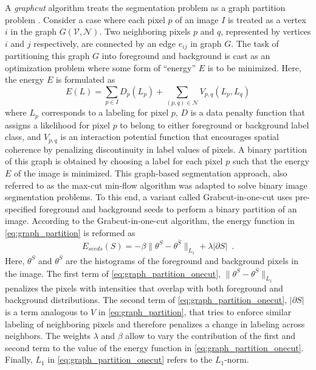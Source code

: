 A \textit{graphcut} algorithm treats the segmentation problem as a graph partition problem \cite{mincut_maxflow}. Consider a case where each pixel $p$ of an image $I$ is treated as a vertex $i$ in the graph $G(\mathcal{V},\mathcal{N})$. Two neighboring pixels $p$ and $q$, represented by vertices $i$ and $j$ respectively, are connected by an edge $e_{ij}$ in graph $G$. The task of partitioning this graph $G$ into foreground and background is cast as an optimization problem where some form of ``energy'' $E$ is to be minimized. Here, the energy $E$ is formulated as 
%
\begin{equation}	\label{eq:graph_partition}
  E(L)=\sum\limits_{p\in I} D_p(L_p)+\sum\limits_{(p,q)\in \mathcal{N}} V_{p,q} (L_p,L_q)
\end{equation}
%
where $L_p$ corresponds to a labeling for pixel $p$, $D$ is a data penalty function that assigns a likelihood for pixel $p$ to belong to either foreground or background label class, and $V_{p,q}$ is an interaction potential function that encourages spatial coherence by penalizing discontinuity in label values of pixels. A binary partition of this graph is obtained by choosing a label for each pixel $p$ such that the energy $E$ of the image is minimized. This graph-based segmentation approach, also referred to as the max-cut min-flow algorithm was adapted to solve binary image segmentation problems. To this end, a variant called Grabcut-in-one-cut \cite{onecut} uses pre-specified foreground and background seeds to perform a binary partition of an image. According to the Grabcut-in-one-cut algorithm, the energy function in \eqref{eq:graph_partition} is reformed as
%
\begin{equation} \label{eq:graph_partition_onecut}
  E_{seeds}(S)=-\beta \| \theta^S-\theta^{\bar{S}} \|_{L_1}+\lambda|\partial S|\enspace.
\end{equation}
%
Here, $\theta^S$ and $\theta^{\bar{S}}$ are the histograms of the foreground and background pixels in the image. The first term 
of \eqref{eq:graph_partition_onecut}, $\| \theta^S-\theta^{\bar{S}} \|_{L_1}$ penalizes the pixels with intensities that overlap with both foreground and background distributions. The second term of \eqref{eq:graph_partition_onecut}, $|\partial S|$ is a term analogous to $V$ in \eqref{eq:graph_partition}, that tries to enforce similar labeling of neighboring pixels and therefore penalizes a change in labeling across neighbors. The weights $\lambda$ and $\beta$ allow to vary the contribution of the first and second term to the value of the energy function in \eqref{eq:graph_partition_onecut}. Finally, $L_1$ in \eqref{eq:graph_partition_onecut} refers to the $L_1$-norm.

